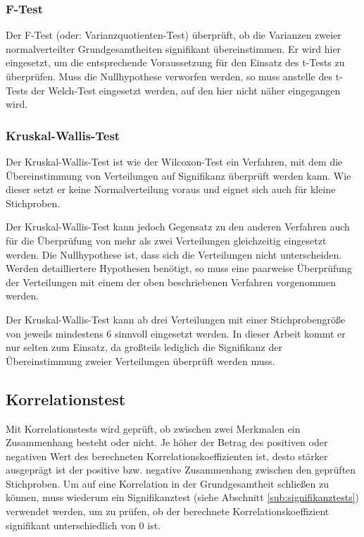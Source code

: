 
\subsubsection{F-Test} %
\label{ssub:f_test}

Der F-Test (oder: Varianzquotienten-Test) überprüft, ob die Varianzen zweier normalverteilter Grundgesamtheiten signifikant übereinstimmen. Er wird hier eingesetzt, um die entsprechende Voraussetzung für den Einsatz des t-Tests zu überprüfen. Muss die Nullhypothese verworfen werden, so muss anstelle des t-Tests der Welch-Test eingesetzt werden, auf den hier nicht näher eingegangen wird. \citep{Duller08}


\subsubsection{Kruskal-Wallis-Test} %
\label{ssub:kruskal_wallis_test}

Der Kruskal-Wallis-Test ist wie der Wilcoxon-Test ein Verfahren, mit dem die Übereinstimmung von Verteilungen auf Signifikanz überprüft werden kann. Wie dieser setzt er keine Normalverteilung voraus und eignet sich auch für kleine Stichproben. 

Der Kruskal-Wallis-Test kann jedoch Gegensatz zu den anderen Verfahren auch für die Überprüfung von mehr als zwei Verteilungen gleichzeitig eingesetzt werden. Die Nullhypothese ist, dass sich die Verteilungen nicht unterscheiden. Werden detailliertere Hypothesen benötigt, so muss eine paarweise Überprüfung der Verteilungen mit einem der oben beschriebenen Verfahren vorgenommen werden. \citep{Duller08}

Der Kruskal-Wallis-Test kann ab drei Verteilungen mit einer Stichprobengröße von jeweils mindestens 6 sinnvoll eingesetzt werden. In dieser Arbeit kommt er nur selten zum Einsatz, da großteils lediglich die Signifikanz der Übereinstimmung zweier Verteilungen überprüft werden muss.


\subsection{Korrelationstest} %
\label{sub:korrelationstest}

Mit Korrelationstests wird geprüft, ob zwischen zwei Merkmalen ein Zusammenhang besteht oder nicht. Je höher der Betrag des positiven oder negativen Wert des berechneten Korrelationskoeffizienten ist, desto stärker ausgeprägt ist der positive bzw. negative Zusammenhang zwischen den geprüften Stichproben. Um auf eine Korrelation in der Grundgesamtheit schließen zu können, muss wiederum ein Signifikanztest (siehe Abschnitt \ref{sub:signifikanztests}) verwendet werden, um zu prüfen, ob der berechnete Korrelationskoeffizient signifikant unterschiedlich von 0 ist.

